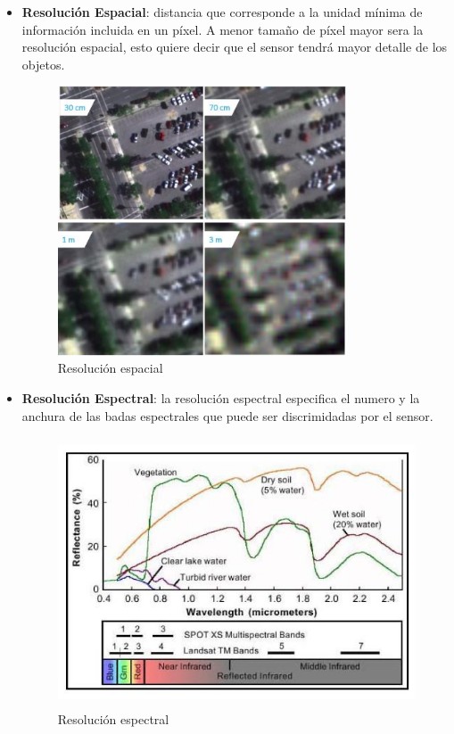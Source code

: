 \begin{itemize}
\item \textbf{Resolución Espacial}: distancia que corresponde a la unidad mínima de información incluida en un píxel. A menor tamaño de píxel mayor sera la resolución espacial, esto quiere decir que el sensor tendrá mayor detalle de los objetos.

\begin{figure}[H] \centering
  \includegraphics[height=8cm,keepaspectratio=true,clip=true]{imagenes/MarcoTeorico/resolucion.png}
  \caption{Resolución espacial \citep{https://iie.fing.edu.uy/proyectos/esopo/eem/}}\label{Fig:resolucion-esp}
\end{figure}

\item \textbf{Resolución Espectral}: la resolución espectral especifica el numero y la anchura de las badas espectrales que puede ser discrimidadas por el sensor.
\begin{figure}[H] \centering
  \includegraphics[height=8cm,keepaspectratio=true,clip=true]{imagenes/MarcoTeorico/resolucion_espectral.jpg}
  \caption{Resolución espectral \citep{http://laotraopinion.net/wp-content/uploads/poder-de-resolucion-espectral.jpg}}\label{Fig:resolucion-espectral}
\end{figure}


\end{itemize}
